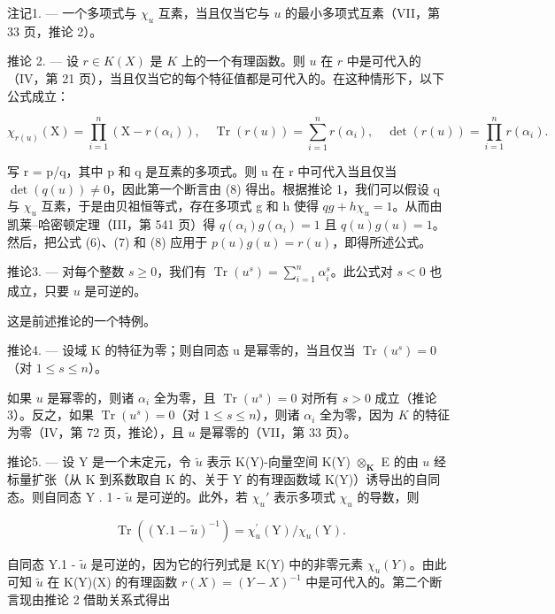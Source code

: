 注记1. --- 一个多项式与 \(\chi_{u}\) 互素，当且仅当它与 \(u\) 的最小多项式互素（VII，第 33 页，推论 2）。

推论 2. --- 设 \(r \in K(X)\) 是 \(K\) 上的一个有理函数。则 \(u\) 在 \(r\) 中是可代入的（IV，第 21 页），当且仅当它的每个特征值都是可代入的。在这种情形下，以下公式成立：

\[
\chi_ {r (u)} (\mathrm{X}) = \prod_ {i = 1} ^ {n} \left(\mathrm{X} - r \left(\alpha_ {i}\right)\right), \quad \operatorname{Tr} (r (u)) = \sum_ {i = 1} ^ {n} r \left(\alpha_ {i}\right), \quad \det (r (u)) = \prod_ {i = 1} ^ {n} r \left(\alpha_ {i}\right).
\]

写 r = p/q，其中 p 和 q 是互素的多项式。则 u 在 r 中可代入当且仅当 \(\det(q(u)) \neq 0\)，因此第一个断言由 (8) 得出。根据推论 1，我们可以假设 q 与 \(\chi_{u}\) 互素，于是由贝祖恒等式，存在多项式 g 和 h 使得 \(qg + h\chi_{u} = 1\)。从而由凯莱–哈密顿定理（III，第 541 页）得 \(q(\alpha_{i})g(\alpha_{i}) = 1\) 且 \(q(u)g(u) = 1\)。然后，把公式 (6)、(7) 和 (8) 应用于 \(p(u)g(u) = r(u)\)，即得所述公式。

推论3. --- 对每个整数 \(s \geqslant 0\)，我们有 \(\operatorname{Tr}(u^s) = \sum_{i=1}^{n} \alpha_i^s\)。此公式对 \(s < 0\) 也成立，只要 \(u\) 是可逆的。

这是前述推论的一个特例。

推论4. --- 设域 K 的特征为零；则自同态 u 是幂零的，当且仅当 \(\operatorname{Tr}(u^{s}) = 0\)（对 \(1 \leqslant s \leqslant n\)）。

如果 \(u\) 是幂零的，则诸 \(\alpha_{i}\) 全为零，且 \(\operatorname{Tr}(u^{s}) = 0\) 对所有 \(s > 0\) 成立（推论 3）。反之，如果 \(\operatorname{Tr}(u^{s}) = 0\)（对 \(1 \leqslant s \leqslant n\)），则诸 \(\alpha_{i}\) 全为零，因为 \(K\) 的特征为零（IV，第 72 页，推论），且 \(u\) 是幂零的（VII，第 33 页）。

推论5. --- 设 Y 是一个未定元，令 \(\tilde{u}\) 表示 K(Y)-向量空间 K(Y) \(\otimes_{\mathbf{K}}\) E 的由 \(u\) 经标量扩张（从 K 到系数取自 K 的、关于 Y 的有理函数域 K(Y)）诱导出的自同态。则自同态 Y . 1 - \(\tilde{u}\) 是可逆的。此外，若 \(\chi_u'\) 表示多项式 \(\chi_u\) 的导数，则

\[
\operatorname{Tr} \left(\left(\mathrm{Y}. 1 - \tilde {u}\right) ^ {- 1}\right) = \chi_ {u} ^ {\prime} (\mathrm{Y}) / \chi_ {u} (\mathrm{Y}).
\]

自同态 Y.1 - \(\tilde{u}\) 是可逆的，因为它的行列式是 K(Y) 中的非零元素 \(\chi_u(Y)\)。由此可知 \(\tilde{u}\) 在 K(Y)(X) 的有理函数 \(r(X) = (Y - X)^{-1}\) 中是可代入的。第二个断言现由推论 2 借助关系式得出

